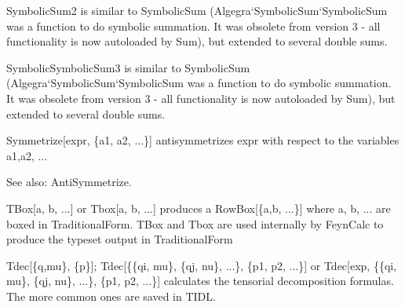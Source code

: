 

SymbolicSum2 is similar to SymbolicSum (Algegra`SymbolicSum`SymbolicSum was a function to do symbolic summation. It was obsolete from
  version 3 - all functionality is now autoloaded by Sum), but extended to several double sums.



SymbolicSymbolicSum3 is similar to SymbolicSum (Algegra`SymbolicSum`SymbolicSum was a function to do symbolic summation. It was obsolete
  from version 3 - all functionality is now autoloaded by Sum), but extended to several double sums.



Symmetrize[expr, \{a1, a2, ...\}] antisymmetrizes expr with respect to the variables a1,a2, ...

See also: AntiSymmetrize.








TBox[a, b, ...] or Tbox[a, b, ...] produces a RowBox[\{a,b, ...\}] where a, b, ... are boxed in TraditionalForm. TBox and Tbox are used
  internally by FeynCalc to produce the typeset output in TraditionalForm



Tdec[\{q,mu\}, \{p\}]; Tdec[\{\{qi, mu\}, \{qj, nu\}, ...\}, \{p1, p2, ...\}] or Tdec[exp, \{\{qi, mu\}, \{qj, nu\}, ...\}, \{p1, p2,
  ...\}] calculates the tensorial decomposition formulas. The more common ones are saved in TIDL.



